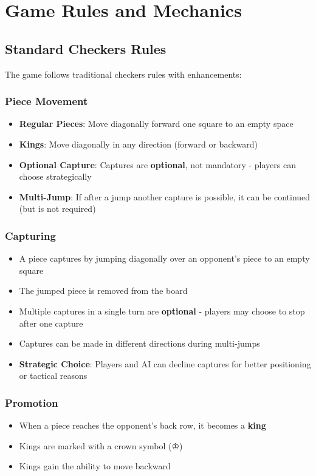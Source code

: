 \documentclass[12pt,a4paper]{article}
\begin{document}
\section{Game Rules and Mechanics}

\subsection{Standard Checkers Rules}

The game follows traditional checkers rules with enhancements:

\subsubsection{Piece Movement}
\begin{itemize}
    \item \textbf{Regular Pieces}: Move diagonally forward one square to an empty space
    \item \textbf{Kings}: Move diagonally in any direction (forward or backward)
    \item \textbf{Optional Capture}: Captures are \textbf{optional}, not mandatory - players can choose strategically
    \item \textbf{Multi-Jump}: If after a jump another capture is possible, it can be continued (but is not required)
\end{itemize}

\subsubsection{Capturing}
\begin{itemize}
    \item A piece captures by jumping diagonally over an opponent's piece to an empty square
    \item The jumped piece is removed from the board
    \item Multiple captures in a single turn are \textbf{optional} - players may choose to stop after one capture
    \item Captures can be made in different directions during multi-jumps
    \item \textbf{Strategic Choice}: Players and AI can decline captures for better positioning or tactical reasons
\end{itemize}

\subsubsection{Promotion}
\begin{itemize}
    \item When a piece reaches the opponent's back row, it becomes a \textbf{king}
    \item Kings are marked with a crown symbol (♔)
    \item Kings gain the ability to move backward
\end{itemize}
\end{document}
